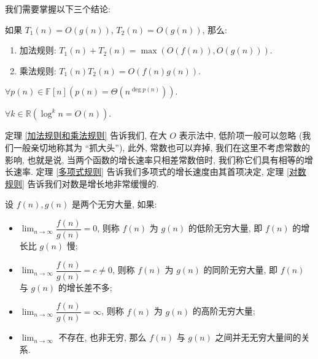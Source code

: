 \documentclass[10pt,UTF8]{book} %
\begin{document}
我们需要掌握以下三个结论:
\begin{thm}
    \label{加法规则和乘法规则}
    如果 $T_1(n) = O(g(n))$, $T_2(n) = O(g(n))$, 那么:
    \begin{enumerate}[label={${\arabic*}^\circ$}, itemsep=0pt]
        \item 加法规则: $T_1(n) + T_2(n) = \max(O(f(n)), O(g(n)))$.
        \item 乘法规则: $T_1(n)T_2(n) = O(f(n)g(n))$.
    \end{enumerate}
\end{thm}
\begin{thm}[多项式规则]
    \label{多项式规则}
    $\forall p(n) \in \mathbb{F}[n] \left( p(n)=\varTheta \left(n^{\deg p(n)}\right) \right)$.
\end{thm}
\begin{thm}[对数规则]
    \label{对数规则}
    $\forall k \in \mathbb{R}\left( \log^k n = O(n) \right)$.
\end{thm}

定理 \ref{加法规则和乘法规则} 告诉我们, 在大 $O$ 表示法中, 低阶项一般可以忽略
(我们一般亲切地称其为 “抓大头”), 此外, 常数也可以弃掉, 我们在这里不考虑常数的影响,
也就是说, 当两个函数的增长速率只相差常数倍时, 我们称它们具有相等的增长速率.
定理 \ref{多项式规则} 告诉我们多项式的增长速度由其首项决定,
定理 \ref{对数规则} 告诉我们对数是增长地非常缓慢的.

\begin{definition}[无穷大量的比较]
    设 $f(n), g(n)$ 是两个无穷大量, 如果:
    \begin{itemize}[itemsep=0pt]
        \item $\lim_{n \to \infty} \dfrac{f(n)}{g(n)} = 0$,
        则称 $f(n)$ 为 $g(n)$ 的低阶无穷大量, 即 $f(n)$ 的增长比
        $g(n)$ 慢;
        \item $\lim_{n \to \infty} \dfrac{f(n)}{g(n)} = c \ne 0$,
        则称 $f(n)$ 为 $g(n)$ 的同阶无穷大量, 即 $f(n)$ 与 $g(n)$ 的增长差不多;
        \item $\lim_{n \to \infty} \dfrac{f(n)}{g(n)} = \infty$,
        则称 $f(n)$ 为 $g(n)$ 的高阶无穷大量;
        \item $\lim_{n \to \infty}$ 不存在, 也非无穷, 那么 $f(n)$ 与 $g(n)$
        之间并无无穷大量间的关系.
    \end{itemize}
\end{definition}
\end{document}
